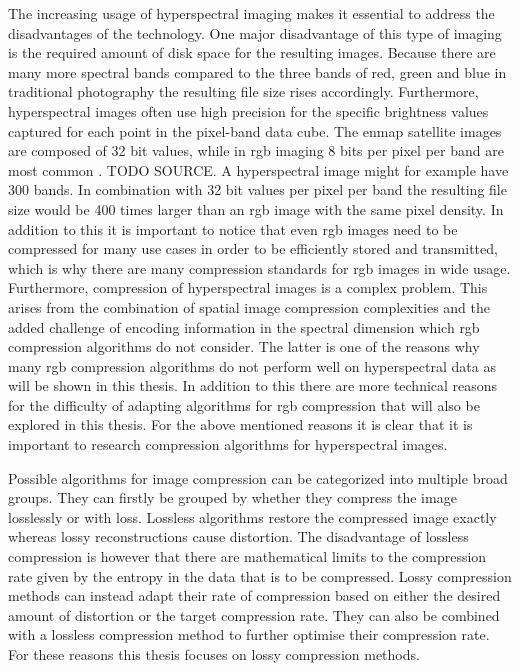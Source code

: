 The increasing usage of hyperspectral imaging makes it essential to address the disadvantages of the technology. One major disadvantage of this type of imaging is the required amount of disk space for the resulting images. Because there are many more spectral bands compared to the three bands of red, green and blue in traditional photography the resulting file size rises accordingly. Furthermore, hyperspectral images often use high precision for the specific brightness values captured for each point in the pixel-band data cube. The \ac{enmap} satellite images are composed of 32 bit values, while in \ac{rgb} imaging 8 bits per pixel per band are most common \citep{guanter_enmap_2015}. TODO SOURCE. A hyperspectral image might for example have 300 bands. In combination with 32 bit values per pixel per band the resulting file size would be 400 times larger than an \ac{rgb} image with the same pixel density. In addition to this it is important to notice that even \ac{rgb} images need to be compressed for many use cases in order to be efficiently stored and transmitted, which is why there are many compression standards for \ac{rgb} images in wide usage.
Furthermore, compression of hyperspectral images is a complex problem. This arises from the combination of spatial image compression complexities and the added challenge of encoding information in the spectral dimension which \ac{rgb} compression algorithms do not consider. The latter is one of the reasons why many \ac{rgb} compression algorithms do not perform well on hyperspectral data as will be shown in this thesis. In addition to this there are more technical reasons for the difficulty of adapting algorithms for \ac{rgb} compression that will also be explored in this thesis. For the above mentioned reasons it is clear that it is important to research compression algorithms for hyperspectral images.

Possible algorithms for image compression can be categorized into multiple broad groups. They can firstly be grouped by whether they compress the image losslessly or with loss. Lossless algorithms restore the compressed image exactly whereas lossy reconstructions cause distortion. The disadvantage of lossless compression is however that there are mathematical limits to the compression rate given by the entropy in the data that is to be compressed. Lossy compression methods can instead adapt their rate of compression based on either the desired amount of distortion or the target compression rate. They can also be combined with a lossless compression method to further optimise their compression rate. For these reasons this thesis focuses on lossy compression methods.

